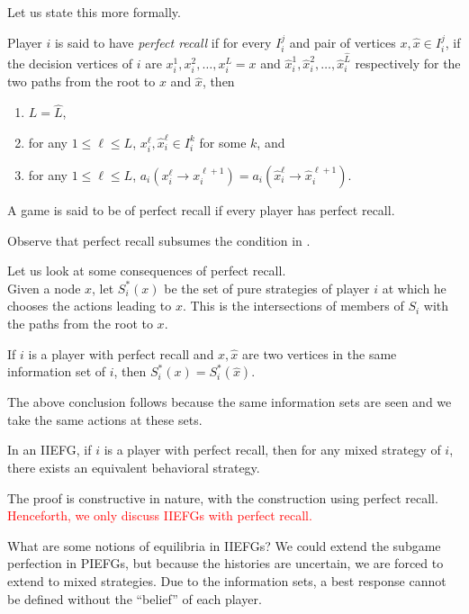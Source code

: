	Let us state this more formally.

	\begin{fdef}
		Player $i$ is said to have \emph{perfect recall} if for every $I_i^j$ and pair of vertices $x,\hat{x} \in I_i^j$, if the decision vertices of $i$ are $x_i^1,x_i^2,\ldots,x_i^L = x$ and $\hat{x}_i^1,\hat{x}_i^2,\ldots,\hat{x}_i^{\hat{L}}$ respectively for the two paths from the root to $x$ and $\hat{x}$, then
		\begin{enumerate}
			\item $L = \hat{L}$,
			\item for any $1 \le \ell \le L$, $x_i^\ell,\hat{x}_i^\ell \in I_i^k$ for some $k$, and
			\item for any $1 \le \ell \le L$, $a_i(x_i^\ell \to x_i^{\ell+1}) = a_i(\hat{x}_i^\ell \to \hat{x}_i^{\ell+1})$.
		\end{enumerate}
		A game is said to be of perfect recall if every player has perfect recall.
	\end{fdef}

	Observe that perfect recall subsumes the condition in .

	Let us look at some consequences of perfect recall.\\
	Given a node $x$, let $S_i^*(x)$ be the set of pure strategies of player $i$ at which he chooses the actions leading to $x$. This is the intersections of members of $S_i$ with the paths from the root to $x$.
	\begin{ftheo}
		If $i$ is a player with perfect recall and $x,\hat{x}$ are two vertices in the same information set of $i$, then $S_i^*(x) = S_i^*(\hat{x})$.
	\end{ftheo}

	The above conclusion follows because the same information sets are seen and we take the same actions at these sets.

	\begin{ftheo}[Kuhn]
		In an IIEFG, if $i$ is a player with perfect recall, then for any mixed strategy of $i$, there exists an equivalent behavioral strategy.
	\end{ftheo}
	The proof is constructive in nature, with the construction using perfect recall.\\

	\textcolor{red}{Henceforth, we only discuss IIEFGs with perfect recall.}
	
	What are some notions of equilibria in IIEFGs? We could extend the subgame perfection in PIEFGs, but because the histories are uncertain, we are forced to extend to mixed strategies. Due to the information sets, a best response cannot be defined without the ``belief'' of each player.

